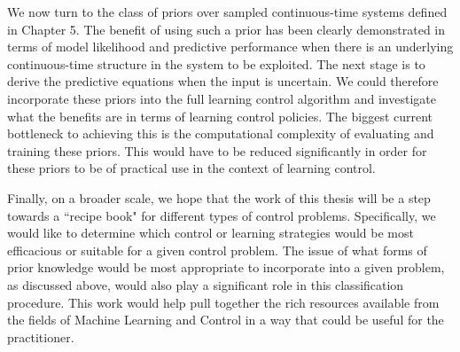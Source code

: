 We now turn to the class of priors over sampled continuous-time systems defined in Chapter 5. The benefit of using such a prior has been clearly demonstrated in terms of model likelihood and predictive performance when there is an underlying continuous-time structure in the system to be exploited. The next stage is to derive the predictive equations when the input is uncertain. We could therefore incorporate these priors into the full learning control algorithm and investigate what the benefits are in terms of learning control policies. The biggest current bottleneck to achieving this is the computational complexity of evaluating and training these priors. This would have to be reduced significantly in order for these priors to be of practical use in the context of learning control.



Finally, on a broader scale, we hope that the work of this thesis will be a step towards a ``recipe book" for different types of control problems. Specifically, we would like to determine which control or learning strategies would be most efficacious or suitable for a given control problem. The issue of what forms of prior knowledge would be most appropriate to incorporate into a given problem, as discussed above, would also play a significant role in this classification procedure. This work would help pull together the rich resources available from the fields of Machine Learning and Control in a way that could be useful for the practitioner.





